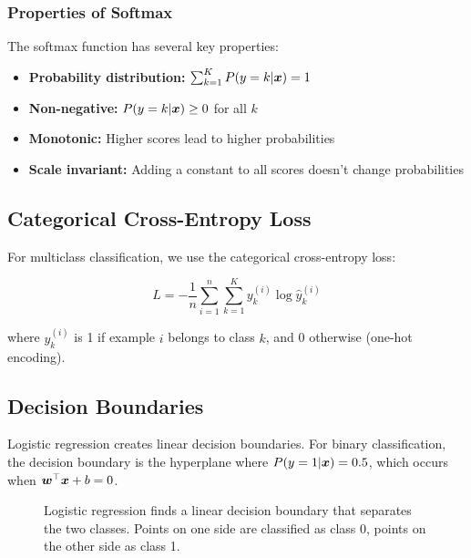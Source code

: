 \subsubsection{Properties of Softmax}

The softmax function has several key properties:
\begin{itemize}
    \item \textbf{Probability distribution:} $\sum_{k=1}^{K} P(y=k|\boldsymbol{x}) = 1$
    \item \textbf{Non-negative:} $P(y=k|\boldsymbol{x}) \geq 0$ for all $k$
    \item \textbf{Monotonic:} Higher scores lead to higher probabilities
    \item \textbf{Scale invariant:} Adding a constant to all scores doesn't change probabilities
\end{itemize}

\subsection{Categorical Cross-Entropy Loss}

For multiclass classification, we use the categorical cross-entropy loss:

\begin{equation}
L = -\frac{1}{n} \sum_{i=1}^{n} \sum_{k=1}^{K} y_k^{(i)} \log \hat{y}_k^{(i)}
\end{equation}

where $y_k^{(i)}$ is 1 if example $i$ belongs to class $k$, and 0 otherwise (one-hot encoding).

\subsection{Decision Boundaries}

Logistic regression creates linear decision boundaries. For binary classification, the decision boundary is the hyperplane where $P(y=1|\boldsymbol{x}) = 0.5$, which occurs when $\boldsymbol{w}^\top \boldsymbol{x} + b = 0$.

\begin{figure}[htbp]
\centering
{}
\caption{Logistic regression finds a linear decision boundary that separates the two classes. Points on one side are classified as class 0, points on the other side as class 1.}
\label{fig:logistic-decision-boundary}
\end{figure}

